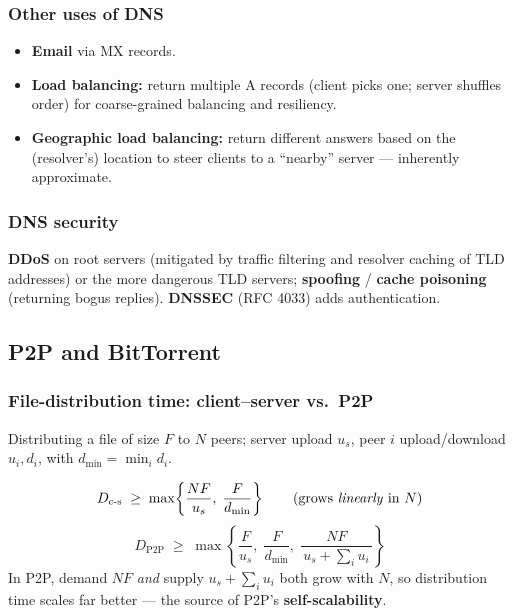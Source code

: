 \documentclass[hidelinks]{article}
\begin{document}
\subsubsection{Other uses of DNS}
\begin{itemize}
    \item \textbf{Email} via MX records.
    \item \textbf{Load balancing:} return multiple A records (client picks
    one; server shuffles order) for coarse-grained balancing and resiliency.
    \item \textbf{Geographic load balancing:} return different answers based
    on the (resolver's) location to steer clients to a ``nearby'' server ---
    inherently approximate.
\end{itemize}

\subsubsection{DNS security}
\textbf{DDoS} on root servers (mitigated by traffic filtering and resolver
caching of TLD addresses) or the more dangerous TLD servers;
\textbf{spoofing} / \textbf{cache poisoning} (returning bogus replies).
\textbf{DNSSEC} (RFC 4033) adds authentication.

\subsection{P2P and BitTorrent}

\subsubsection{File-distribution time: client--server vs.\ P2P}
Distributing a file of size $F$ to $N$ peers; server upload $u_s$, peer $i$
upload/download $u_i, d_i$, with $d_{\min}=\min_i d_i$.

\[
    D_{\text{c-s}} \;\geq\; \max\!\left\{\frac{N F}{u_s},\; \frac{F}{d_{\min}}\right\}
    \qquad\text{(grows \emph{linearly} in } N\text{)}
\]
\[
    D_{\text{P2P}} \;\geq\; \max\!\left\{\frac{F}{u_s},\; \frac{F}{d_{\min}},\;
        \frac{N F}{\,u_s + \sum_i u_i\,}\right\}
\]
In P2P, demand $N F$ \emph{and} supply $u_s + \sum_i u_i$ both grow with $N$,
so distribution time scales far better --- the source of P2P's
\textbf{self-scalability}.
\end{document}
